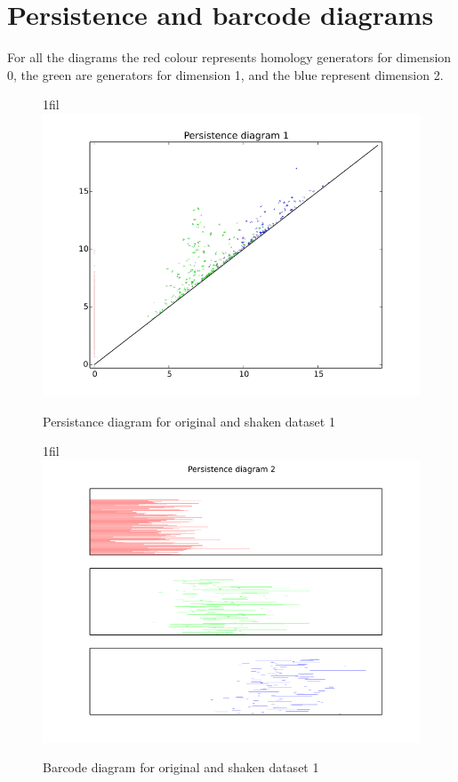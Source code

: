 \documentclass[11pt]{article}
\makeatletter
\newcommand*{\centerfloat}{
  \parindent \z@
  \leftskip \z@ \@plus 1fil \@minus \textwidth
  \rightskip\leftskip
  \parfillskip \z@skip}
\makeatother
\begin{document}
\appendix
\appendixpage
\section{\label{appdix}Persistence and barcode diagrams}
For all the diagrams the red colour represents homology generators for dimension 0, the green are generators for dimension 1, and the blue represent dimension 2.
\begin{figure}[H]
   \centerfloat
   \includegraphics[width=1.2\textwidth]{data1_d18_pers.png}
   \caption{Persistance diagram for original and shaken dataset 1}
   \label{data1_pers}
\end{figure}

\begin{figure}[H]
   \centerfloat
   \includegraphics[width=1.2\textwidth]{data1_d18_bar.png}
   \caption{Barcode diagram for original and shaken dataset 1}
   \label{data1_bar}
\end{figure}
\end{document}
